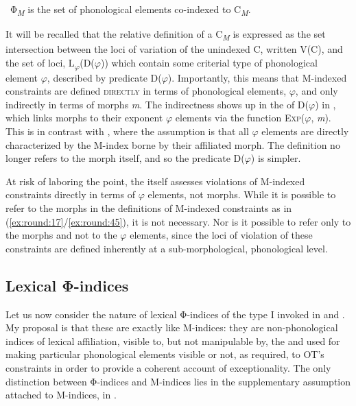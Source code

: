 \documentclass[output=paper,
modfonts
]{LSP/langsci}
\begin{document}
\ Φ\textit{\textsubscript{M}} is the set of phonological elements co-indexed to C\textit{\textsubscript{M}}.
\z

It will be recalled that the relative definition of a  C\textit{\textsubscript{M}} is expressed as the set intersection between the loci of variation of the unindexed  C, written V(C), and the set of loci, L\textsubscript{$\varphi $}(D($\varphi $)) which contain some criterial type of phonological element $\varphi $, described by predicate D($\varphi $). Importantly, this means that M-indexed constraints are defined \textsc{directly} in terms of phonological elements, $\varphi $, and only indirectly in terms of morphs \textit{m}. The indirectness shows up in the  of D($\varphi $) in , which links morphs to their exponent $\varphi $ elements via the function \textsc{Exp}($\varphi $, \textit{m}). This is in contrast with , where the assumption is that all $\varphi $ elements are directly characterized by the M-index borne by their affiliated morph. The  definition no longer refers to the morph itself, and so the predicate D($\varphi $) is simpler. 

At risk of laboring the point, the  itself assesses violations of M-indexed constraints directly in terms of $\varphi $ elements, not morphs. While it is possible to refer to the morphs in the definitions of M-indexed constraints as in (\ref{ex:round:17}\slash\ref{ex:round:45}), it is not necessary. Nor is it possible to refer only to the morphs and not to the $\varphi $ elements, since the loci of violation of these constraints are defined inherently at a sub-morphological, phonological level.

\subsection[Lexical Φ{}-indices]{Lexical Φ-indices}\label{sec:round:7.2}
\label{bkm:Ref335561253}
Let us now consider the nature of lexical Φ-indices of the type I invoked in  and . My proposal is that these are exactly like M-indices: they are non-phonological indices of lexical affiliation, visible to, but not manipulable by, the  and used for making particular phonological elements visible or not, as required, to OT's constraints in order to provide a coherent account of exceptionality. The only distinction between Φ-indices and M-indices lies in the supplementary assumption attached to M-indices, in .
\end{document}
